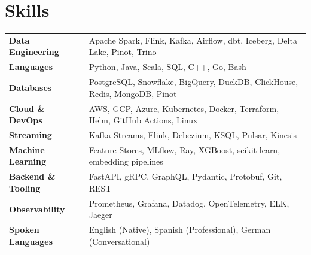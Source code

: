 \documentclass[letterpaper,10pt]{article}
\begin{document}
\section{Skills}
\renewcommand{\arraystretch}{1.4}
\begin{tabularx}{\textwidth}{@{}>{\bfseries\color{accent}}l X@{}}
    Data Engineering    & Apache Spark, Flink, Kafka, Airflow, dbt, Iceberg, Delta Lake, Pinot, Trino \\
    Languages           & Python, Java, Scala, SQL, C++, Go, Bash \\
    Databases           & PostgreSQL, Snowflake, BigQuery, DuckDB, ClickHouse, Redis, MongoDB, Pinot \\
    Cloud \& DevOps     & AWS, GCP, Azure, Kubernetes, Docker, Terraform, Helm, GitHub Actions, Linux \\
    Streaming           & Kafka Streams, Flink, Debezium, KSQL, Pulsar, Kinesis \\
    Machine Learning    & Feature Stores, MLflow, Ray, XGBoost, scikit-learn, embedding pipelines \\
    Backend \& Tooling  & FastAPI, gRPC, GraphQL, Pydantic, Protobuf, Git, REST \\
    Observability       & Prometheus, Grafana, Datadog, OpenTelemetry, ELK, Jaeger \\
    Spoken Languages    & English (Native), Spanish (Professional), German (Conversational) \\
\end{tabularx}
\end{document}
